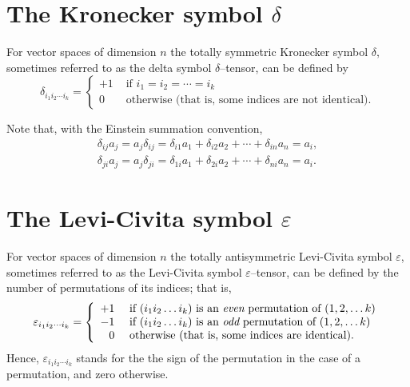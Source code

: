 \section{The Kronecker symbol $\delta$}
For vector spaces of dimension $n$ the totally symmetric Kronecker symbol $\delta$,
sometimes referred to
as the delta symbol $\delta$--tensor, can be defined by
\begin{equation}
\delta_{i_1 i_2\cdots i_k}
=
\left\{
\begin{array}{rl}
+1&\textrm{ if }  i_1 = i_2 = \cdots = i_k \\
0&\textrm{ otherwise (that is, some indices are not identical).}
\end{array}
\right.
\end{equation}

Note that, with the Einstein summation convention,
\begin{equation}
\begin{split}
\delta_{ij} a_j    = a_j  \delta_{ij} =
\delta_{i1} a_1
+
\delta_{i2} a_2
+
\cdots
+
\delta_{in} a_n  =a_i
,  \\
\delta_{ji} a_j = a_j  \delta_{ji} =
\delta_{1i} a_1
+
\delta_{2i} a_2
+
\cdots
+
\delta_{ni} a_n  =a_i
.
\end{split}
\end{equation}

\section{The Levi-Civita symbol $\varepsilon$}
For vector spaces of dimension $n$ the totally antisymmetric Levi-Civita symbol $\varepsilon$, sometimes referred to
as the Levi-Civita symbol $\varepsilon$--tensor, can be defined by the number of permutations of its indices; that is,
\begin{equation}
\varepsilon_{i_1 i_2\cdots i_k}
=
\left\{
\begin{array}{rl}
+1&\textrm{ if } (i_1 i_2\ldots i_k) \textrm{ is an {\em even} permutation of } (1,2,\ldots k)\\
-1&\textrm{ if } (i_1 i_2\ldots i_k) \textrm{ is an {\em odd} permutation of } (1,2,\ldots k)\\
0&\textrm{ otherwise (that is, some indices are identical).}
\end{array}
\right.
\label{2014-m-ch-lcs}
\end{equation}
Hence, $\varepsilon_{i_1 i_2\cdots i_k}$ stands for the  the sign of the permutation in the case of a permutation, and zero otherwise.

